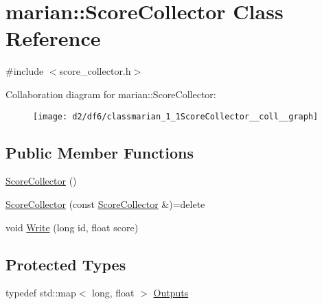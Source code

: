 \hypertarget{classmarian_1_1ScoreCollector}{}\section{marian\+:\+:Score\+Collector Class Reference}
\label{classmarian_1_1ScoreCollector}


{\ttfamily \#include $<$score\+\_\+collector.\+h$>$}



Collaboration diagram for marian\+:\+:Score\+Collector\+:
\nopagebreak
\begin{figure}[H]
\begin{center}
\leavevmode
\texttt{[image: d2/df6/classmarian\_1\_1ScoreCollector\_\_coll\_\_graph]}
\end{center}
\end{figure}
\subsection*{Public Member Functions}
\begin{DoxyCompactItemize}
\item 
\hyperlink{classmarian_1_1ScoreCollector_ae444055c2489000c304e015516a2c914}{Score\+Collector} ()
\item 
\hyperlink{classmarian_1_1ScoreCollector_a489f30078c9076f4c5e96079b2452aab}{Score\+Collector} (const \hyperlink{classmarian_1_1ScoreCollector}{Score\+Collector} \&)=delete
\item 
void \hyperlink{classmarian_1_1ScoreCollector_aea5e72c3f74aec169fbb8df344c49fff}{Write} (long id, float score)
\end{DoxyCompactItemize}
\subsection*{Protected Types}
\begin{DoxyCompactItemize}
\item 
typedef std\+::map$<$ long, float $>$ \hyperlink{classmarian_1_1ScoreCollector_a0f23001507924b1866c1f6a370a2b369}{Outputs}
\end{DoxyCompactItemize}
